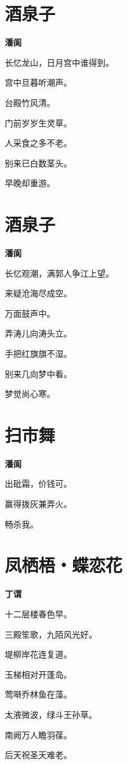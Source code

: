 \documentclass[12pt,a4paper]{ctexbook}
\begin{document}
\section{酒泉子}
\textbf{潘阆}\par\vspace{0.5em}
长忆龙山，日月宫中谁得到。\par
宫中旦暮听潮声。\par
台殿竹风清。\par
门前岁岁生灵草。\par
人采食之多不老。\par
别来已白数茎头。\par
早晚却重游。\par

\section{酒泉子}
\textbf{潘阆}\par\vspace{0.5em}
长忆观潮，满郭人争江上望。\par
来疑沧海尽成空。\par
万面鼓声中。\par
弄涛儿向涛头立。\par
手把红旗旗不湿。\par
别来几向梦中看。\par
梦觉尚心寒。\par

\section{扫市舞}
\textbf{潘阆}\par\vspace{0.5em}
出砒霜，价钱可。\par
赢得拨灰兼弄火。\par
畅杀我。\par

\section{凤栖梧・蝶恋花}
\textbf{丁谓}\par\vspace{0.5em}
十二层楼春色早。\par
三殿笙歌，九陌风光好。\par
堤柳岸花连复道。\par
玉梯相对开蓬岛。\par
莺啭乔林鱼在藻。\par
太液微波，绿斗王孙草。\par
南阙万人瞻羽葆。\par
后天祝圣天难老。\par
\end{document}
